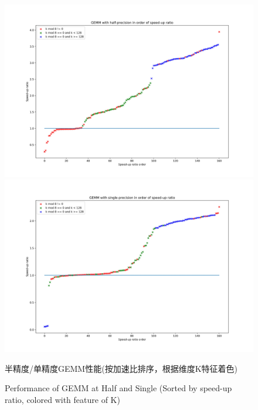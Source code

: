 \begin{figure}
	\centering
	\includegraphics[width=15cm]{figures/GEMM-Half-TF-Byratio-Tri.jpg}\\
	\includegraphics[width=15cm]{figures/GEMM-Single-TF-Byratio-Tri.jpg}
	\renewcommand{\thefigure}{\arabic{section}-\arabic{figure} }
	\renewcommand{\figurename}{图}
	\caption{半精度/单精度GEMM性能(按加速比排序，根据维度K特征着色)}
	\addtocounter{figure}{-1}
	\renewcommand{\thefigure}{\arabic{section}-\arabic{figure} }
	\renewcommand{\figurename}{Figure}
	\caption{Performance of GEMM at Half and Single (Sorted by speed-up ratio, colored with feature of K)}
	\label{Fig-PerfGemmByratioTri}
\end{figure}

